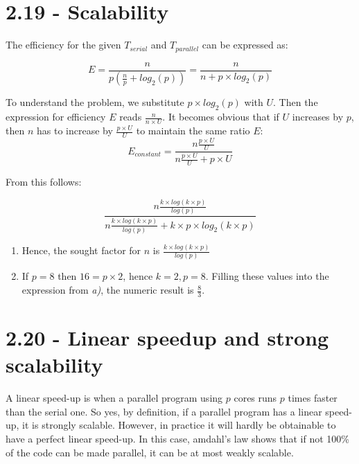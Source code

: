 \documentclass[a4paper,11pt,twoside]{article}
\begin{document}
\section{2.19 - Scalability}
The efficiency for the given $T_{serial}$ and $T_{parallel}$ can be expressed as:

\begin{equation*}
E = \frac{n}{p (\frac{n}{p} + log_{2}(p))} = \frac{n}{n + p \times log_{2}(p)}   
\end{equation*}

To understand the problem, we substitute $p \times log_{2}(p)$ with $U$. Then the expression for efficiency $E$ reads $\frac{n}{n \times U}$. It becomes obvious that if $U$ increases by $p$, then $n$ has to increase by $\frac{p \times U}{U}$ to maintain the same ratio $E$:
\begin{equation*}
E_{constant} = \frac{n \frac{p \times U}{U}}{n \frac{p \times U}{U} + {p \times U}}
\end{equation*}

From this follows:

\begin{equation*}
\frac{n\frac{k \times log(k\times p)}{log(p)}}{n \frac{k \times log(k \times p)}{log(p)} + k \times p \times log_{2}(k \times p)}
\end{equation*}


\begin{enumerate}[label={\alph*)}]
\item Hence, the sought factor for $n$ is $\frac{k \times log(k\times p)}{log(p)}$

\item If $p = 8$ then $16 = p \times 2$, hence $k = 2, p = 8$. Filling these values into the expression from \textit{a)}, the numeric result is $\frac{8}{3}$.
  
\end{enumerate}


\section{2.20 - Linear speedup and strong scalability}
A linear speed-up is when a parallel program using $p$ cores runs $p$ times faster than the serial one. So yes, by definition, if a parallel program has a linear speed-up, it is strongly scalable. However, in practice it will hardly be obtainable to have a perfect linear speed-up. In this case, amdahl's law shows that if not 100\% of the code can be made parallel, it can be at most weakly scalable.
\end{document}
